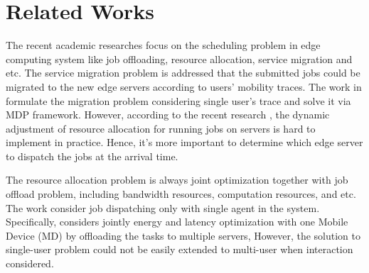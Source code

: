 \section{Related Works}
\label{sec:review}
The recent academic researches focus on the scheduling problem in edge computing system like job offloading, resource allocation, service migration and etc.
The service migration problem is addressed that the submitted jobs could be migrated to the new edge servers according to users' mobility traces.
The work in \cite{TON19-WangSq} formulate the migration problem considering single user's trace and solve it via MDP framework.
However, according to the recent research \cite{INFOCOM19-WuC}, the dynamic adjustment of resource allocation for running jobs on servers is hard to implement in practice.
Hence, it's more important to determine which edge server to dispatch the jobs at the arrival time.

The resource allocation problem is always joint optimization together with job offload problem, including bandwidth resources, computation resources, and etc.
The work \cite{TOC17-DinhTQ,TOC18-LyuX} consider job dispatching only with single agent in the system.
Specifically, \cite{TOC17-DinhTQ} considers jointly energy and latency optimization with one Mobile Device (MD) by offloading the tasks to multiple servers, 
However, the solution to single-user problem could not be easily extended to multi-user when interaction considered.


